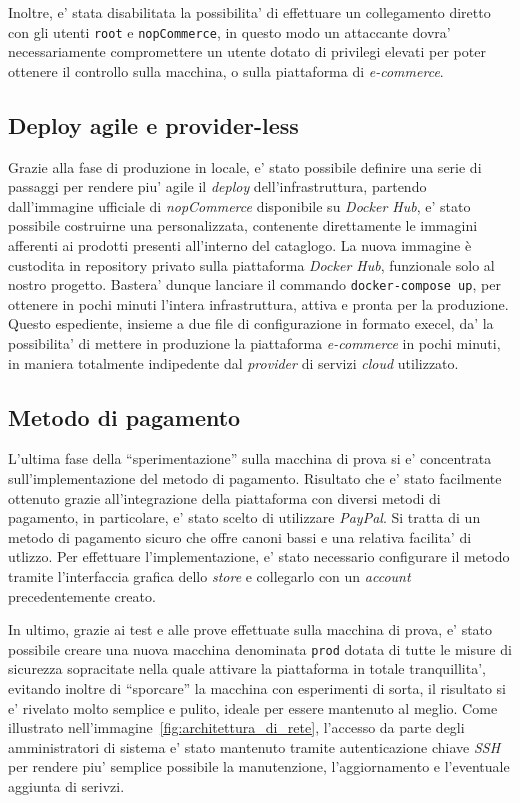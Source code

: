\documentclass[a4paper]{report}
\newcommand{\quotes}[1]{``#1''}
\begin{document}
			Inoltre, e' stata disabilitata la possibilita' di effettuare un collegamento diretto con gli utenti
			\texttt{root} e \texttt{nopCommerce}, in questo modo un attaccante dovra' necessariamente compromettere un
			utente dotato di privilegi elevati per poter ottenere il controllo sulla macchina, o sulla piattaforma di
			\emph{e-commerce}.

		\subsection{Deploy agile e provider-less}\label{deploy_agile_e_provider_less}
			Grazie alla fase di produzione in locale, e' stato possibile definire una serie di passaggi per rendere piu'
			agile il \emph{deploy} dell'infrastruttura, partendo dall'immagine ufficiale di \emph{nopCommerce}
			disponibile su \emph{Docker Hub}, e' stato possibile costruirne una personalizzata, contenente direttamente
			le immagini afferenti ai prodotti presenti all'interno del cataglogo.  La nuova immagine è custodita in
			repository privato sulla piattaforma \emph{Docker Hub}, funzionale solo al nostro progetto.  Bastera' dunque
			lanciare il commando \texttt{docker-compose up}, per ottenere in pochi minuti l'intera infrastruttura,
			attiva e pronta per la produzione.  Questo espediente, insieme a due file di configurazione in formato
			execel, da' la possibilita' di mettere in produzione la piattaforma \emph{ e-commerce} in pochi minuti, in
			maniera totalmente indipedente dal \emph{provider} di servizi \emph{cloud} utilizzato.

		\subsection{Metodo di pagamento}\label{metodo_di_pagamento}
			L'ultima fase della \quotes{sperimentazione} sulla macchina di prova si e' concentrata sull'implementazione
			del metodo di pagamento. Risultato che e' stato facilmente ottenuto grazie all'integrazione della
			piattaforma con diversi metodi di pagamento, in particolare, e' stato scelto di utilizzare \emph{PayPal}. Si
			tratta di un metodo di pagamento sicuro che offre canoni bassi e una relativa facilita' di utlizzo. Per
			effettuare l'implementazione, e' stato necessario configurare il metodo tramite l'interfaccia grafica dello
			\emph{store} e collegarlo con un \emph{account} precedentemente creato.

		In ultimo, grazie ai test e alle prove effettuate sulla macchina di prova, e' stato possibile creare una nuova
		macchina denominata \texttt{prod} dotata di tutte le misure di sicurezza sopracitate nella quale attivare la
		piattaforma in totale tranquillita', evitando inoltre di \quotes{sporcare} la macchina con esperimenti di sorta,
		il risultato si e' rivelato molto semplice e pulito, ideale per essere mantenuto al meglio. Come illustrato
		nell'immagine~\ref{fig:architettura_di_rete}, l'accesso da parte degli amministratori di sistema e' stato
		mantenuto tramite autenticazione chiave \emph{SSH} per rendere piu' semplice possibile la manutenzione,
		l'aggiornamento e l'eventuale aggiunta di serivzi.
\end{document}
